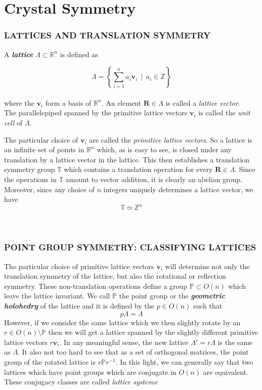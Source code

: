 \documentclass[9 pt]{report}
\def\*#1{\boldsymbol{#1}}
\begin{document}
\chapter*{Crystal Symmetry}
{\centering
\subsection*{LATTICES AND TRANSLATION SYMMETRY}}
\begin{tcolorbox}
	A \textbf{\emph{lattice}} $\Lambda \subset \mathbb{R}^n$  is defined as
	
	$$ \Lambda = \left\{ \sum_{i=1}^n a_i\*v_i \:\:\big|\:\: a_i \in \mathbb{Z}  \right\} $$
	\\
	where the $\*v_i$ form a basis of $\mathbb{R}^n$. An element $\*R \in \Lambda$ is called a \emph{lattice vector}.
	\\
	The parallelepiped spanned by the primitive lattice vectors $\*v_i$ is called the \emph{unit cell} of $\Lambda$.
\end{tcolorbox}
The particular choice of $\*v_i$ are called the \emph{primitive lattice vectors}. So a lattice is an infinite set of points in $\mathbb{R}^n$ which, as is easy to see, is closed under any translation by a lattice vector in the lattice. This then establishes a translation symmetry group $\mathbb{T}$ which contains a translation operation for every $\*R \in \Lambda$. Since the operations in $\mathbb{T}$ amount to vector addition, it is clearly an abelian group. Moreover, since any choice of $n$ integers uniquely determines a lattice vector, we have
$$ \mathbb{T} \simeq \mathbb{Z}^n  $$
\\
\\
{\centering
\subsection*{POINT GROUP SYMMETRY: CLASSIFYING LATTICES}}
The particular choice of primitive lattice vectors $\*v_i$ will determine not only the translation symmetry of the lattice, but also the rotational or reflection symmetry. These non-translation operations define a group $\mathbb{P}\subset O(n)$ which leave the lattice invariant. We call $\mathbb{P}$ the point group or the \textbf{\emph{geometric holohedry}} of the lattice and it is defined by the $p\in O(n)$ such that
$$ p\Lambda = \Lambda $$
However, if we consider the same lattice which we then slightly rotate by an $r\in O(n)\setminus \mathbb{P}$ then we will get a lattice spanned by the slightly different primitive lattice vectors $r\*v_i$. In any meaningful sense, the new lattice $\Lambda'=r\Lambda$ is the same as $\Lambda$. It also not too hard to see that as a set of orthogonal matrices, the point group of the rotated lattice is $r\mathbb{P}r^{-1}$. In this light, we can generally say that two lattices which have point groups which are conjugate in $O(n)$ are equivalent. These conjugacy classes are called \emph{lattice systems}:
\end{document}
